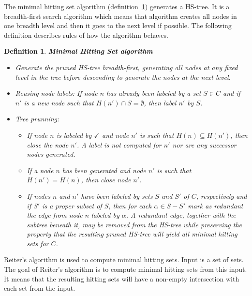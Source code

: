 \documentclass[12pt,a4paper]{article}
\newtheorem{definition}{Definition}[subsection]
\begin{document}
The minimal hitting set algorithm (definition~\ref{def:mhs}) generates a HS-tree. It is a breadth-first search algorithm which means that algorithm creates all nodes in one breadth level and then it goes to the next level if possible. The following definition describes rules of how the algorithm behaves.

\begin{definition}{\textbf{Minimal Hitting Set algorithm}}{\indent}
	\label{def:mhs}
	\begin{itemize}
		\item Generate the pruned HS-tree breadth-first, generating all nodes at any fixed level in the tree before descending to generate the nodes at the next level.
		
		\item Reusing node labels: If node $n$ has already been labeled by a set $S \in C$ and if $n'$ is a new node such that $H(n') \cap S = \emptyset$, then label $n'$ by $S$.
		
		\item Tree prunning:
		
		\begin{itemize}
			\item If node $n$ is labeled by $\checkmark$ and node $n'$ is such that $H(n) \subseteq H(n')$, then close the node $n'$. A label is not computed for $n'$ nor are any successor nodes generated.
			
			\item If a node $n$ has been generated and node $n'$ is such that $H(n') = H(n)$, then close node $n'$.
			
			\item If nodes $n$ and $n'$ have been labeled by sets $S$ and $S'$ of $C$, respectively and if $S'$ is a proper subset of $S$, then for each $\alpha \in S - S'$ mark as redundant the edge from node $n$ labeled by $\alpha$. A redundant edge, together with the subtree beneath it, may be removed from the HS-tree while preserving the property that the resulting pruned HS-tree will yield all minimal hitting sets for $C$.
			
		\end{itemize}	
		
	\end{itemize}
	
\end{definition}

Reiter's algorithm is used to compute minimal hitting sets. Input is a set of sets. The goal of Reiter's algorithm is to compute minimal hitting sets from this input. It means that the resulting hitting sets will have a non-empty intersection with each set from the input.
\end{document}
